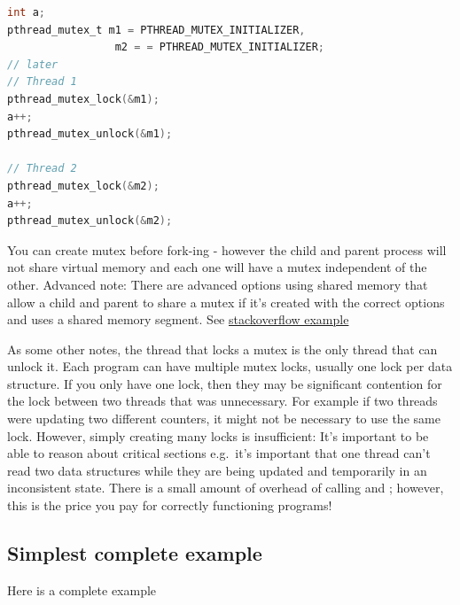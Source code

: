 \begin{lstlisting}[language=C]
int a;
pthread_mutex_t m1 = PTHREAD_MUTEX_INITIALIZER,
                 m2 = = PTHREAD_MUTEX_INITIALIZER;
// later
// Thread 1
pthread_mutex_lock(&m1);
a++;
pthread_mutex_unlock(&m1);

// Thread 2
pthread_mutex_lock(&m2);
a++;
pthread_mutex_unlock(&m2);
\end{lstlisting}

You can create mutex before fork-ing - however the child and parent process will not share virtual memory and each one will have a mutex independent of the other. Advanced note: There are advanced options using shared memory that allow a child and parent to share a mutex if it's created with the correct options and uses a shared memory segment. See \href{http://stackoverflow.com/questions/19172541/procs-fork-and-mutexes}{stackoverflow example}

As some other notes, the thread that locks a mutex is the only thread that can unlock it. Each program can have multiple mutex locks, usually one lock per data structure. If you only have one lock, then they may be significant contention for the lock between two threads that was unnecessary. For example if two threads were updating two different counters, it might not be necessary to use the same lock. However, simply creating many locks is insufficient: It's important to be able to reason about critical sections e.g.~it's important that one thread can't read two data structures while they are being updated and temporarily in an inconsistent state. There is a small amount of overhead of calling  and ; however, this is the price you pay for correctly functioning programs!

\subsection{Simplest complete example}

Here is a complete example

